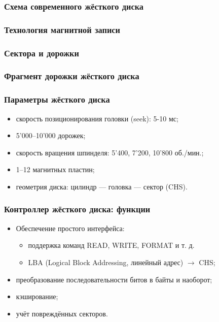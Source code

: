 \begin{frame}
\frametitle{Схема современного жёсткого диска}
\end{frame}

\begin{frame}
\frametitle{Технология магнитной записи}
\end{frame}

\begin{frame}
\frametitle{Сектора и дорожки}
\end{frame}

\begin{frame}
\frametitle{Фрагмент дорожки жёсткого диска}
\end{frame}

\begin{frame}
\frametitle{Параметры жёсткого диска}
\begin{itemize}[<+->]
    \item скорость позиционирования головки (seek): 5-10 мс;
    \item 5'000–10'000 дорожек;
    \item скорость вращения шпинделя: 5'400, 7'200, 10'800 об./мин.;
    \item 1–12 магнитных пластин;
    \item геометрия диска: цилиндр — головка — сектор (CHS).
\end{itemize}
\end{frame}


\begin{frame}
\frametitle{Контроллер жёсткого диска: функции}
\begin{itemize}
    \item Обеспечение простого интерфейса:
    \begin{itemize}
        \item поддержка команд READ, WRITE, FORMAT и т. д.
        \item LBA (Logical Block Addressing, линейный адрес) $\to$ CHS;
    \end{itemize}
    \item преобразование последовательности битов в байты и наоборот;
    \item кэширование;
    \item учёт повреждённых секторов.
\end{itemize}
\end{frame}

